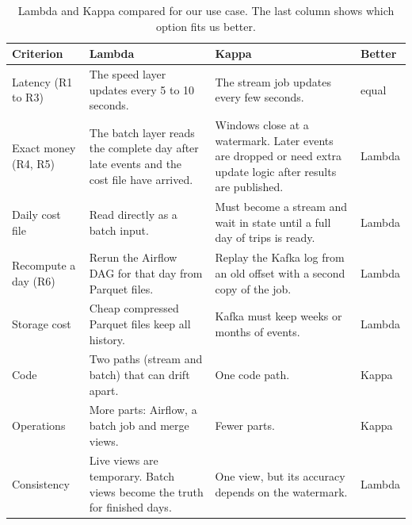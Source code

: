 \begin{table}[!htb]
\centering\small
\caption{Lambda and Kappa compared for our use case. The last column shows which option fits us better.}
\label{tab:lambda-kappa}
\begin{tabularx}{\textwidth}{@{}P{2.6cm} L L P{1.2cm}@{}}
\toprule
\textbf{Criterion} & \textbf{Lambda} & \textbf{Kappa} & \textbf{Better} \\
\midrule
Latency (R1 to R3) & The speed layer updates every 5 to 10 seconds. & The stream job updates every few seconds. & equal \\
Exact money (R4, R5) & The batch layer reads the complete day after late events and the cost file have arrived. & Windows close at a watermark. Later events are dropped or need extra update logic after results are published. & Lambda \\
Daily cost file & Read directly as a batch input. & Must become a stream and wait in state until a full day of trips is ready. & Lambda \\
Recompute a day (R6) & Rerun the Airflow DAG for that day from Parquet files. & Replay the Kafka log from an old offset with a second copy of the job. & Lambda \\
Storage cost & Cheap compressed Parquet files keep all history. & Kafka must keep weeks or months of events. & Lambda \\
Code & Two paths (stream and batch) that can drift apart. & One code path. & Kappa \\
Operations & More parts: Airflow, a batch job and merge views. & Fewer parts. & Kappa \\
Consistency & Live views are temporary. Batch views become the truth for finished days. & One view, but its accuracy depends on the watermark. & Lambda \\
\bottomrule
\end{tabularx}
\end{table}

